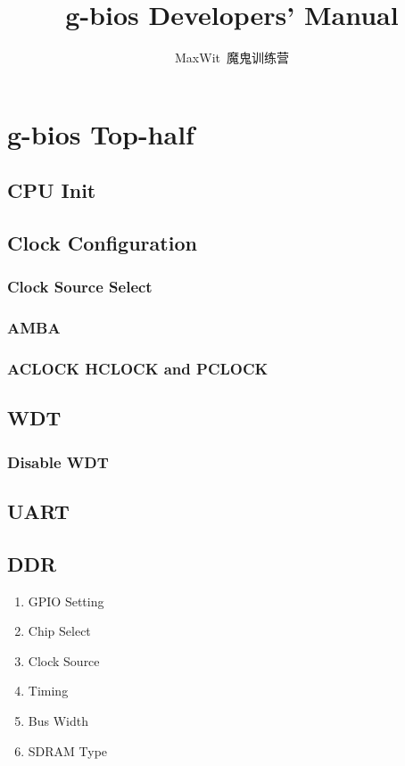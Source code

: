 \documentclass[a4paper,11pt]{book}
\title{g-bios Developers' Manual}
\author{MaxWit~魔鬼训练营}
\begin{document}
\maketitle
\tableofcontents

\chapter{g-bios Top-half}

\section{CPU Init}

\section{Clock Configuration}
\subsection{Clock Source Select}
\subsection{AMBA}
\subsection{ACLOCK HCLOCK and PCLOCK}

\section{WDT}
\subsection{Disable WDT}

\section{UART}

\section{DDR}
\begin{enumerate}
\item GPIO Setting
\item Chip Select
\item Clock Source
\item Timing
\item Bus Width
\item SDRAM Type
\end{enumerate}
\end{document}
